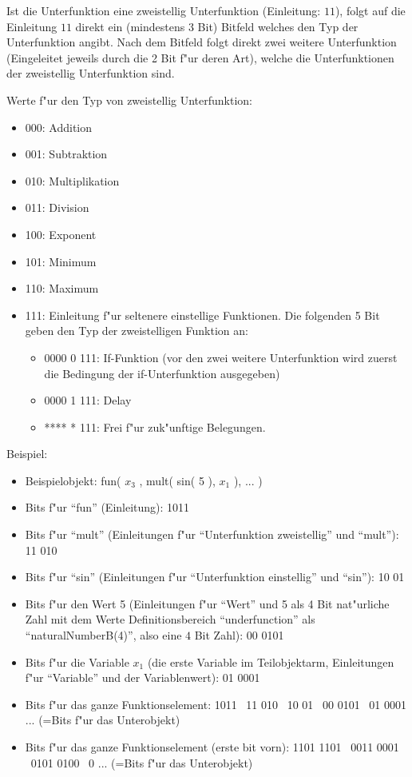 \bigskip\noindent
Ist die Unterfunktion eine zweistellig Unterfunktion (Einleitung: $11$), folgt auf die Einleitung $11$ direkt ein (mindestens 3 Bit) Bitfeld welches den Typ der Unterfunktion angibt. Nach dem Bitfeld folgt direkt zwei weitere Unterfunktion (Eingeleitet jeweils durch die 2 Bit f"ur deren Art), welche die Unterfunktionen der zweistellig Unterfunktion sind.

\bigskip\noindent
Werte f"ur den Typ von zweistellig Unterfunktion:
\begin{itemize}
 \item 000: Addition
 \item 001: Subtraktion
 \item 010: Multiplikation
 \item 011: Division
 \item 100: Exponent
 \item 101: Minimum
 \item 110: Maximum
 \item 111: Einleitung f"ur seltenere einstellige Funktionen. Die folgenden 5 Bit geben den Typ der zweistelligen Funktion an:
 \begin{itemize}
 \item 0000 0 111: If-Funktion (vor den zwei weitere Unterfunktion wird zuerst die Bedingung der if-Unterfunktion ausgegeben)
 \item 0000 1 111: Delay
  \item **** * 111: Frei f"ur zuk"unftige Belegungen.
 \end{itemize}
\end{itemize}

\bigskip\noindent
Beispiel:
\begin{itemize}
 \item Beispielobjekt: fun( $x_3$ , mult( sin( 5 ), $x_1$ ), ... )
 \item Bits f"ur ``fun'' (Einleitung): 1011
 \item Bits f"ur ``mult'' (Einleitungen f"ur ``Unterfunktion zweistellig'' und ``mult''): 11 010
 \item Bits f"ur ``sin'' (Einleitungen f"ur ``Unterfunktion einstellig'' und ``sin''): 10 01
 \item Bits f"ur den Wert 5 (Einleitungen f"ur ``Wert'' und 5 als 4 Bit nat"urliche Zahl mit dem Werte Definitionsbereich ``underfunction'' als ``naturalNumberB(4)'', also eine $4$ Bit Zahl): 00 0101
 \item Bits f"ur die Variable $x_1$ (die erste Variable im Teilobjektarm, Einleitungen f"ur ``Variable'' und der Variablenwert): 01 0001
 \item Bits f"ur das ganze Funktionselement: 1011 \ 11 010 \ 10 01 \ 00 0101 \ 01 0001 ... (=Bits f"ur das Unterobjekt)
 \item Bits f"ur das ganze Funktionselement (erste bit vorn): 1101 1101 \ 0011 0001 \ 0101 0100 \ 0 ... (=Bits f"ur das Unterobjekt)
\end{itemize}

